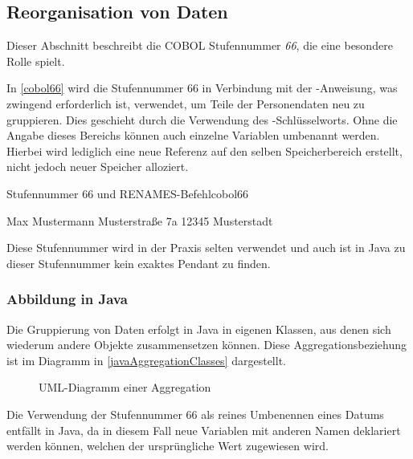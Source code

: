 
\subsection{Reorganisation von Daten}
Dieser Abschnitt beschreibt die COBOL Stufennummer \textit{66}, die eine besondere Rolle spielt.

In \autoref{cobol66} wird die Stufennummer 66 in Verbindung mit der -Anweisung, was zwingend erforderlich ist, verwendet, um Teile der Personendaten neu zu gruppieren. Dies geschieht durch die Verwendung des -Schlüsselworts. Ohne die Angabe dieses Bereichs können auch einzelne Variablen umbenannt werden. Hierbei wird lediglich eine neue Referenz auf den selben Speicherbereich erstellt, nicht jedoch neuer Speicher alloziert.

\begin{codeWithCaption}{Stufennummer 66 und RENAMES-Befehl}{cobol66}
\begin{shellwindow}
Max       Mustermann
Musterstraße  7a   12345 Musterstadt   
\end{shellwindow}
\end{codeWithCaption}

Diese Stufennummer wird in der Praxis selten verwendet und auch ist in Java zu dieser Stufennummer kein exaktes Pendant zu finden. 
\subsubsection*{Abbildung in Java}
Die Gruppierung von Daten erfolgt in Java in eigenen Klassen, aus denen sich wiederum andere Objekte zusammensetzen können. Diese Aggregationsbeziehung ist im Diagramm in \autoref{javaAggregationClasses} dargestellt. 

\begin{figure}[H]
    \centering
    \caption{UML-Diagramm einer Aggregation}
    \label{javaAggregationClasses}
\end{figure}
Die Verwendung der Stufennummer 66 als reines Umbenennen eines Datums entfällt in Java, da in diesem Fall neue Variablen mit anderen Namen deklariert werden können, welchen der ursprüngliche Wert zugewiesen wird.
